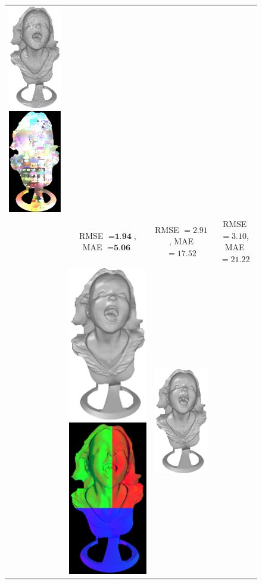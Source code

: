\begin{figure}
{\begin{tabular}{cccc}
\includegraphics[height=0.25\linewidth]{figures/result/comp_ratio_love_shape.pdf} 
\includegraphics[height=0.25\linewidth]{figures/result/comp_ratio_love_albedo.pdf} \\
& {\small RMSE $= \textbf{1.94}$, MAE $=\textbf{5.06}$} & {\small RMSE $= 2.91$, MAE $=17.52$} & {\small RMSE $= 3.10$, MAE $=21.22$} \\
\multirow{-15}{*}{\parbox[t]{2.5mm}{}} &   
 \includegraphics[height=0.25\linewidth]{figures/result/comp_robust_rgb_shape.pdf}
 \includegraphics[height=0.25\linewidth]{figures/result/comp_robust_rgb_albedo.pdf} &
 \includegraphics[height=0.25\linewidth]{figures/result/comp_robust_pattern_shape.pdf} 

\end{tabular}}
\end{figure}
